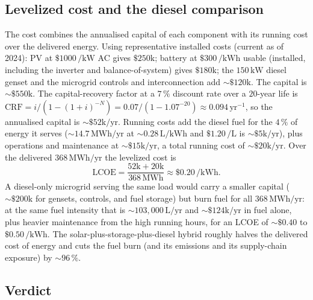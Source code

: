 

\subsection{Levelized cost and the diesel comparison}

The cost combines the annualised capital of each component with its
running cost over the delivered energy. Using representative installed
costs (current as of 2024): PV at $\$1000\,\si{\per\kilo\watt}$ AC gives
$\$250\text{k}$; battery at $\$300\,\si{\per\kilo\watt\hour}$ usable
(installed, including the inverter and balance-of-system) gives
$\$180\text{k}$; the $150\,\si{\kilo\watt}$ diesel genset and the
microgrid controls and interconnection add $\sim \$120\text{k}$. The
capital is $\sim \$550\text{k}$. The capital-recovery factor at a
$7\,\%$ discount rate over a $20$-year life is $\text{CRF} = i/(1 -
(1+i)^{-N}) = 0.07/(1 - 1.07^{-20}) \approx 0.094\,\text{yr}^{-1}$, so the
annualised capital is $\sim \$52\text{k}/\text{yr}$. Running costs add the
diesel fuel for the $4\,\%$ of energy it serves ($\sim 14.7\,\si{\mega
\watt\hour}/\text{yr}$ at $\sim 0.28\,\si{\liter\per\kilo\watt\hour}$ and
$\$1.20\,\si{\per\liter}$ is $\sim \$5\text{k}/\text{yr}$), plus
operations and maintenance at $\sim \$15\text{k}/\text{yr}$, a total
running cost of $\sim \$20\text{k}/\text{yr}$. Over the delivered
$368\,\si{\mega\watt\hour}/\text{yr}$ the levelized cost is
\[
\text{LCOE} = \frac{52\text{k} + 20\text{k}}{368\,\si{\mega\watt\hour}}
\approx \$0.20\,\si{\per\kilo\watt\hour}.
\]
A diesel-only microgrid serving the same load would carry a smaller
capital ($\sim \$200\text{k}$ for gensets, controls, and fuel storage)
but burn fuel for all $368\,\si{\mega\watt\hour}/\text{yr}$: at the same
fuel intensity that is $\sim 103{,}000\,\si{\liter}/\text{yr}$ and $\sim
\$124\text{k}/\text{yr}$ in fuel alone, plus heavier maintenance from the
high running hours, for an LCOE of $\sim \$0.40$ to $\$0.50\,\si{\per\kilo
\watt\hour}$. The solar-plus-storage-plus-diesel hybrid roughly halves the
delivered cost of energy and cuts the fuel burn (and its emissions and its
supply-chain exposure) by $\sim 96\,\%$.

\subsection{Verdict}

